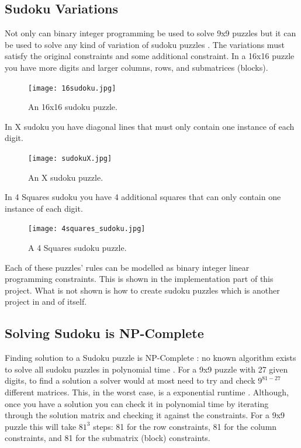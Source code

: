 \documentclass[12pt]{article}
\begin{document}
\subsection{Sudoku Variations}
Not only can binary integer programming be used to solve 9x9 puzzles but it can be used to solve any kind of variation of sudoku puzzles \cite{sudoku3}.  The variations must satisfy the original constraints and some additional constraint.  In a 16x16 puzzle you have more digits and larger columns, rows, and submatrices (blocks).  
\begin{figure}[H]
\centering
\texttt{[image: 16sudoku.jpg]}
\caption{An 16x16 sudoku puzzle.}
\end{figure}
In X sudoku you have diagonal lines that must only contain one instance of each digit.
\begin{figure}[H]
\centering
\texttt{[image: sudokuX.jpg]}
\caption{An X sudoku puzzle.}
\end{figure}
In 4 Squares sudoku you have 4 additional squares that can only contain one instance of each digit.
\begin{figure}[H]
\centering
\texttt{[image: 4squares\_sudoku.jpg]}
\caption{A 4 Squares sudoku puzzle.}
\end{figure}
Each of these puzzles' rules can be modelled as binary integer linear programming constraints.  This is shown in the implementation part of this project.  What is not shown is how to create sudoku puzzles which is another project in and of itself.

\subsection{Solving Sudoku is NP-Complete}
Finding solution to a Sudoku puzzle is NP-Complete \cite{sudoku3}: no known algorithm exists to solve all sudoku puzzles in polynomial time \cite{sudoku5}.  For a 9x9 puzzle with 27 given digits, to find a solution a solver would at most need to try and check $9^{81-27}$ different matrices.  This, in the worst case, is a exponential runtime \cite{sudoku6}.  Although, once you have a solution you can check it in polynomial time by iterating through the solution matrix and checking it against the constraints.  For a 9x9 puzzle this will take $81^3$ steps: 81 for the row constraints, 81 for the column constraints, and 81 for the submatrix (block) constraints. 
\end{document}
